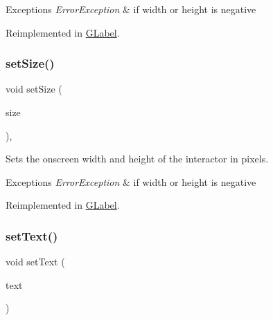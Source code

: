\begin{DoxyExceptions}{Exceptions}
{\em Error\+Exception} & if width or height is negative \\
\hline
\end{DoxyExceptions}


Reimplemented in \mbox{\hyperlink{classsgl_1_1GLabel_a8ba9af72c23f52d4b93096a13a11f150}{G\+Label}}.

\mbox{\label{classsgl_1_1GInteractor_ae2b628228f192c2702c4ce941b2af68f}} 
\subsubsection{\texorpdfstring{set\+Size()}{setSize()}\hspace{0.1cm}{\footnotesize\ttfamily [2/2]}}
{\footnotesize\ttfamily void set\+Size (\begin{DoxyParamCaption}\item[{const \mbox{\hyperlink{structsgl_1_1GDimension}{G\+Dimension}} \&}]{size }\end{DoxyParamCaption})\hspace{0.3cm}{\ttfamily [virtual]}, {\ttfamily [inherited]}}



Sets the onscreen width and height of the interactor in pixels. 


\begin{DoxyExceptions}{Exceptions}
{\em Error\+Exception} & if width or height is negative \\
\hline
\end{DoxyExceptions}


Reimplemented in \mbox{\hyperlink{classsgl_1_1GLabel_a42d96e60c62d7770993327d7147d77b8}{G\+Label}}.

\mbox{\label{classsgl_1_1GTextField_ac1ae51949d41ee9054634be5967d91b8}} 
\subsubsection{\texorpdfstring{set\+Text()}{setText()}}
{\footnotesize\ttfamily void set\+Text (\begin{DoxyParamCaption}\item[{const std\+::string \&}]{text }\end{DoxyParamCaption})\hspace{0.3cm}{\ttfamily [virtual]}}



